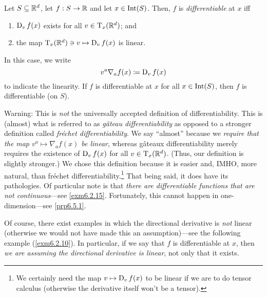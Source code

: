 \begin{dfn}\label{Derivative}
Let $S\subseteq \R ^d$, let $f:S\rightarrow \R$ and let $x\in \Int (S)$.  Then, $f$ is \emph{differentiable} at $x$ iff
\begin{enumerate}
\item $\D _vf(x)$ exists for all $v\in \tangent{\R ^d}{x}$; and
\item the map $\tangent{\R ^d}{x}\ni v\mapsto \D _vf(x)$ is linear.
\end{enumerate}
In this case, we write
\begin{equation}
v^a\nabla _af(x)\coloneqq \D _vf(x)
\end{equation}
 to indicate the linearity.  If $f$ is differentiable at $x$ for all $x\in \Int (S)$, then $f$ is differentiable (on $S$).
\begin{rmk}
Warning:  This is \emph{not} the universally accepted definition of differentiability.  This is (almost) what is referred to as \emph{g\^{a}teau differentiability} as opposed to a stronger definition called \emph{fr\'{e}chet differentiability}.  We say ``almost'' because we \emph{require that the map $v^a\mapsto \nabla _af(x)$ be linear}, whereas g\^{a}teaux differentiability merely requires the existence of $\D _vf(x)$ for all $v\in \tangent{\R ^d}{x}$.  (Thus, our definition is slightly stronger.)  We chose this definition because it is easier and, IMHO, more natural, than fr\'{e}chet differentiability.\footnote{We certainly need the map $v\mapsto \D _vf(x)$ to be linear if we are to do tensor calculus (otherwise the derivative itself won't be a tensor).}  That being said, it does have its pathologies.  Of particular note is that \emph{there are differentiable functions that are not continuous}---see \cref{exm6.2.15}.  Fortunately, this cannot happen in one-dimension---see \cref{prp6.5.1}.
\end{rmk}
\begin{rmk}
Of course, there exist examples in which the directional derivative is \emph{not} linear (otherwise we would not have made this an assumption)---see the following example (\cref{exm6.2.10}).  In particular, if we say that $f$ is differentiable at $x$, then \emph{we are assuming the directional derivative is linear}, not only that it exists.


\end{rmk}
\end{dfn}
